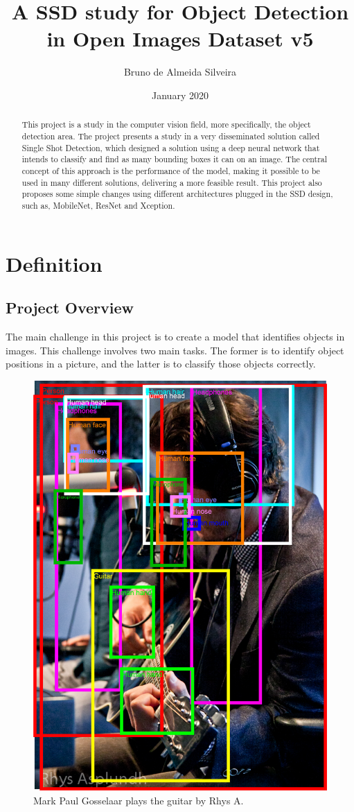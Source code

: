 \documentclass[11pt, a4paper, twocolumn]{article}
\title{\textbf{A SSD study for Object Detection in Open Images Dataset v5}}
\author{Bruno de Almeida Silveira}
\date{January 2020}
\begin{document}
\begin{titlingpage}
	\maketitle
	\begin{abstract}
		This project is a study in the computer vision field, more specifically, the object detection area. The project presents a study in a very disseminated solution called Single Shot Detection, which designed a solution using a deep neural network that intends to classify and find as many bounding boxes it can on an image. The central concept of this approach is the performance of the model, making it possible to be used in many different solutions, delivering a more feasible result. This project also proposes some simple changes using different architectures plugged in the SSD design, such as, MobileNet, ResNet and Xception.
	\end{abstract}
\end{titlingpage}

\section{Definition}
\subsection{Project Overview}
The main challenge in this project is to create a model that identifies objects in images. This challenge involves two main tasks. The former is to identify object positions in a picture, and the latter is to classify those objects correctly. 

\begin{figure}[ht]
	\centering
	\includegraphics[width=.4\textwidth]{intro-1.png}
	\caption{\scriptsize Mark Paul Gosselaar plays the guitar by Rhys A. \cite{google:1}}
\end{figure}
\end{document}
